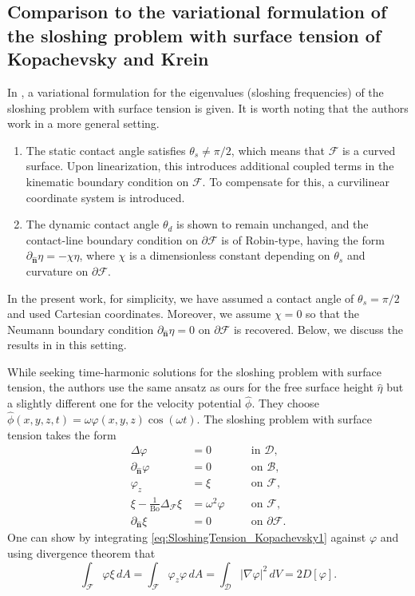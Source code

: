 \documentclass[letterpaper, 12pt]{amsart}
\newcommand{\bond}{\mathrm{Bo}}
\newcommand{\D}{\mathcal{D}}
\newcommand{\B}{\mathcal{B}}
\newcommand{\F}{\mathcal{F}}
\newcommand{\n}{\mathbf{\hat{n}}}
\begin{document}
\subsection{Comparison to the variational formulation of the sloshing problem with surface tension of Kopachevsky and Krein} \label{sec:CompKopachevsky}
In \cite[pp.207]{Kopachevsky:2012aa}, a  variational formulation for the eigenvalues (sloshing frequencies) of the sloshing problem with surface tension is given. It is worth noting that the authors work in a more general setting. 
\begin{enumerate}
\item The static contact angle satisfies $\theta_s\neq\pi/2$, which means that $\F$ is a curved surface. Upon linearization, this introduces additional coupled terms in the kinematic boundary condition on $\F$. To compensate for this, a  curvilinear coordinate system is introduced.  
\item The dynamic contact angle $\theta_d$ is shown to remain unchanged, and the contact-line boundary condition on $\partial\F$ is of Robin-type, having the form $\partial_\n\eta = -\chi\eta$, where $\chi$ is a dimensionless constant depending on $\theta_s$ and curvature on $\partial\F$. 
\end{enumerate}
In the present work, for simplicity, we have assumed a contact angle of $\theta_s=\pi/2$ and used Cartesian coordinates. Moreover, we assume $\chi=0$ so that the Neumann boundary condition $\partial_\n\eta=0$ on $\partial\F$ is recovered. Below, we discuss the results in \cite{Kopachevsky:2012aa} in this  setting. 

While seeking  time-harmonic solutions for the sloshing problem with surface tension, the authors use the same ansatz as ours for the free surface height $\hat\eta$ but a slightly different one for the velocity potential $\hat\phi$. They choose $\hat\phi(x,y,z,t) = \omega\varphi(x,y,z)\cos(\omega t)$. The sloshing problem with surface tension takes the form
\begin{subequations}\label{eq:SloshingTension_Kopachevsky}
\begin{alignat}{2}
\label{eq:SloshingTension_Kopachevsky1} \Delta\varphi & = 0 \ \ && \textrm{ in }\D, \\
\label{eq:SloshingTension_Kopachevsky2} \partial_\n\varphi & = 0 \ \ && \textrm{ on }\B, \\
\label{eq:SloshingTension_Kopachevsky3} \varphi_z & = \xi \ \ && \textrm{ on }\F, \\
\label{eq:SloshingTension_Kopachevsky4} \xi - \frac{1}{\bond}\Delta_\F\xi & = \omega^2\varphi \ \ && \textrm{ on }\F, \\
\label{eq:SloshingTension_Kopachevsky5} \partial_\n\xi & = 0 \ \ && \textrm{ on } \partial\F.
\end{alignat}
\end{subequations}
One can show by integrating \eqref{eq:SloshingTension_Kopachevsky1} against $\varphi$ and using divergence theorem that
\begin{equation}
\int_{\F}\varphi\xi\, dA = \int_{\F}\varphi_z\varphi\, dA = \int_{\D}|\nabla\varphi|^2\, dV = 2D[\varphi]. \label{eq:SloshingTension_Kopachevsky6}
\end{equation}
\end{document}
